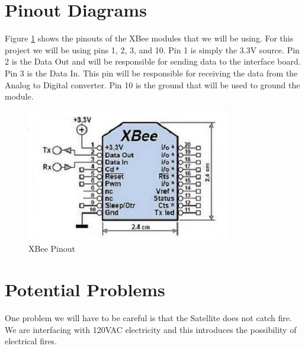 \section{Pinout Diagrams}
Figure \ref{XBeePinout} shows the pinouts of the XBee modules that
we will be using. For this project we will be using pins 1, 2, 3, and 10.
Pin 1 is simply the 3.3V source. Pin 2 is the Data Out and will be 
responsible for sending data to the interface board. Pin 3 is the 
Data In. This pin will be responsible for receiving the data from 
the Analog to Digital converter. Pin 10 is the ground that will be used
to ground the module.

\begin{figure}[H]
\centering
\includegraphics[scale=1.0]{Hardware/images/XBeePinout.png}
\caption{XBee Pinout}
\label{XBeePinout}
\end{figure}

\section{Potential Problems}

One problem we will have to be careful is that the Satellite does
not catch fire. We are interfacing with 120VAC electricity and 
this introduces the possibility of electrical fires.